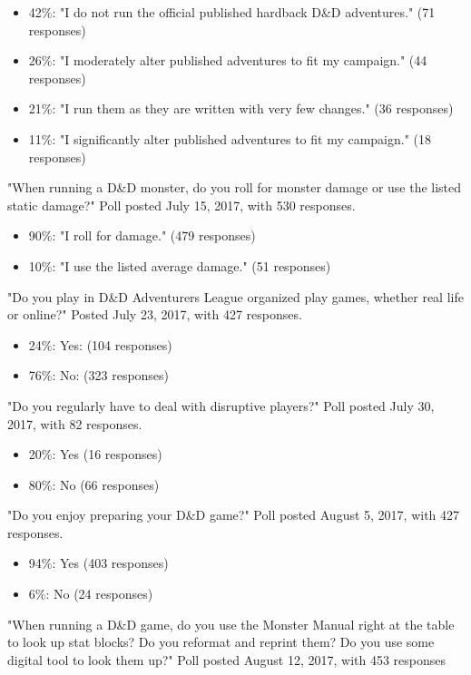 \documentclass[10pt,a4paper,twoside,bg=print,twocolumn,openany,nodeprecatedcode]{dndbook}
\begin{document}
\begin{itemize}
\item 42\%: "I do not run the official published hardback D\&D adventures." (71 responses)
\item 26\%: "I moderately alter published adventures to fit my campaign." (44 responses)
\item 21\%: "I run them as they are written with very few changes." (36 responses)
\item 11\%: "I significantly alter published adventures to fit my campaign." (18 responses)
\end{itemize}

"When running a D\&D monster, do you roll for monster damage or use the listed static damage?"
Poll posted July 15, 2017, with 530 responses.

\begin{itemize}
\item 90\%: "I roll for damage." (479 responses)
\item 10\%: "I use the listed average damage." (51 responses)
\end{itemize}

"Do you play in D\&D Adventurers League organized play games, whether
real life or online?"
Posted July 23, 2017, with 427 responses.

\begin{itemize}
\item 24\%: Yes: (104 responses)
\item 76\%: No: (323 responses)
\end{itemize}

"Do you regularly have to deal with disruptive players?"
Poll posted July 30, 2017, with 82 responses.

\begin{itemize}
\item 20\%: Yes (16 responses)
\item 80\%: No (66 responses)
\end{itemize}

"Do you enjoy preparing your D\&D game?"
Poll posted August 5, 2017, with 427 responses.

\begin{itemize}
\item 94\%: Yes (403 responses)
\item 6\%: No (24 responses)
\end{itemize}

"When running a D\&D game, do you use the Monster Manual right at the table to look up stat blocks? Do you reformat and reprint them? Do you use some digital tool to look them up?"
Poll posted August 12, 2017, with 453 responses
\end{document}
